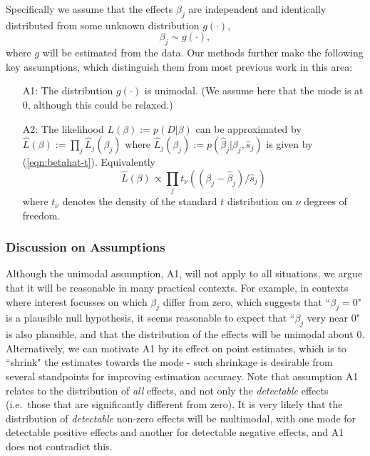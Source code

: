 \documentclass[11pt]{article}
\def\bhat{\hat{\beta}}
\def\shat{\hat{s}}
\begin{document}
 Specifically we assume that the effects $\beta_j$ are independent and identically distributed from some unknown distribution $g(\cdot)$,
 \begin{equation} \label{eqn:beta}
 \beta_j \sim g(\cdot),
 \end{equation}
 where $g$ will be estimated from
 the data.   
  Our methods further make the following key assumptions, which distinguish them from most previous work in this area:
   \begin{enumerate}
  \item[A1:] The distribution $g(\cdot)$ is unimodal. (We assume here that the mode is at 0, although 
this could be relaxed.)  
 \item[A2:] The likelihood $L(\beta) := p(D | \beta)$ can be approximated by $\hat{L}(\beta) := \prod_j \hat{L}_j(\beta_j)$ where
 $\hat{L}_j(\beta_j) := p(\bhat_j | \beta_j, \shat_j)$ is given by (\ref{eqn:betahat-t}).
Equivalently
  \begin{equation} \label{eqn:lik}
 \hat{L}(\beta) \propto \prod_j t_\nu((\beta_j-\bhat_j)/\shat_j)
 \end{equation}
 where $t_\nu$ denotes the density of the standard $t$ distribution on $\nu$ degrees of freedom.
 \end{enumerate}
 
 
 \subsubsection*{Discussion on Assumptions}
 
Although the unimodal assumption, A1, will not apply to all situations, we argue that it will be reasonable in many practical contexts. 
For example, in contexts where interest focusses on which $\beta_j$ differ from zero, which suggests that ``$\beta_j=0$" is a plausible null hypothesis,  
it seems reasonable to expect that ``$\beta_j$ very near 0" is also plausible, and that the distribution of the effects will be unimodal about 0. 
Alternatively, we can motivate A1 by its effect on point estimates, which is to ``shrink" the estimates towards the mode - 
such shrinkage is desirable from several standpoints for improving estimation accuracy. 
Note that assumption A1 relates to the distribution of {\it all} effects, and not only the {\it detectable} effects (i.e.~those that are significantly different from zero). It is very likely that the distribution of {\it detectable} non-zero effects will be multimodal, with one mode for detectable positive effects and another for detectable negative effects, and A1 does not contradict this.
\end{document}
